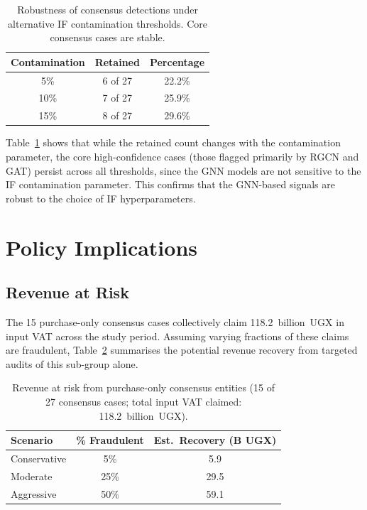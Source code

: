 \documentclass[10pt,twocolumn]{article}
\begin{document}
\begin{table}[htb]
  \centering
  \caption{Robustness of consensus detections under alternative IF contamination
           thresholds. Core consensus cases are stable.}
  \label{tab:robustness}
  \small
  \begin{tabular}{ccc}
    \toprule
    Contamination & Retained & Percentage \\
    \midrule
    5\%  &  6 of 27 & 22.2\% \\
    10\% &  7 of 27 & 25.9\% \\
    15\% &  8 of 27 & 29.6\% \\
    \bottomrule
  \end{tabular}
\end{table}

Table~\ref{tab:robustness} shows that while the retained count changes with
the contamination parameter, the core high-confidence cases (those flagged
primarily by RGCN and GAT) persist across all thresholds, since the GNN models
are not sensitive to the IF contamination parameter. This confirms that the
GNN-based signals are robust to the choice of IF hyperparameters.

\section{Policy Implications}
\label{sec:policy}

\subsection{Revenue at Risk}

The 15 purchase-only consensus cases collectively claim 118.2~billion~UGX in
input VAT across the study period. Assuming varying fractions of these claims
are fraudulent, Table~\ref{tab:revenue} summarises the potential revenue
recovery from targeted audits of this sub-group alone.

\begin{table}[htb]
  \centering
  \caption{Revenue at risk from purchase-only consensus entities
           (15 of 27 consensus cases; total input VAT claimed:
           118.2~billion~UGX).}
  \label{tab:revenue}
  \small
  \begin{tabular}{lcc}
    \toprule
    Scenario & \% Fraudulent & Est.\ Recovery (B UGX) \\
    \midrule
    Conservative & 5\%  &   5.9 \\
    Moderate     & 25\% &  29.5 \\
    Aggressive   & 50\% &  59.1 \\
    \bottomrule
  \end{tabular}
\end{table}
\end{document}
